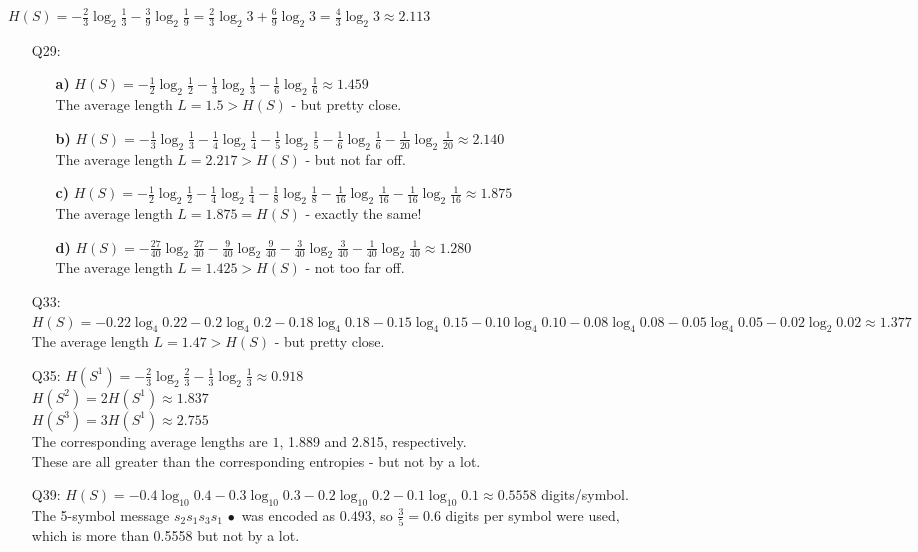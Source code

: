 \documentclass[11pt]{article}
\begin{document}
\newpage{}
$H(S) = -\frac{2}{3}\log_2\frac{1}{3}-\frac{3}{9}\log_2\frac{1}{9}
      =  \frac{2}{3}\log_2 3 + \frac{6}{9}\log_2 3
      =  \frac{4}{3}\log_2 3
      \approx 2.113$

\bigskip{}
\begin{itemize}
  \item[{Q29:}]
    \begin{itemize}
      \item[{\bf a)}] $H(S) = -\frac{1}{2}\log_2\frac{1}{2} -\frac{1}{3}\log_2\frac{1}{3} -\frac{1}{6}\log_2\frac{1}{6} \approx 1.459$
        \\The average length $L = 1.5 > H(S)$ - but pretty close.
      \item[{\bf b)}] $H(S) = -\frac{1}{3}\log_2\frac{1}{3} -\frac{1}{4}\log_2\frac{1}{4} -\frac{1}{5}\log_2\frac{1}{5} -\frac{1}{6}\log_2\frac{1}{6} -\frac{1}{20}\log_2\frac{1}{20} \approx 2.140$
        \\The average length $L = 2.217 > H(S)$ - but not far off.
      \item[{\bf c)}] $H(S) = -\frac{1}{2}\log_2\frac{1}{2} -\frac{1}{4}\log_2\frac{1}{4} -\frac{1}{8}\log_2\frac{1}{8} -\frac{1}{16}\log_2\frac{1}{16} -\frac{1}{16}\log_2\frac{1}{16} \approx 1.875$
        \\The average length $L = 1.875 = H(S)$ - exactly the same!
      \item[{\bf d)}] $H(S) = -\frac{27}{40}\log_2\frac{27}{40} -\frac{9}{40}\log_2\frac{9}{40} -\frac{3}{40}\log_2\frac{3}{40} -\frac{1}{40}\log_2\frac{1}{40} \approx 1.280$
        \\The average length $L = 1.425 > H(S)$ - not too far off.
    \end{itemize}
  \item[{Q33:}] $H(S) = -0.22\log_4 0.22 -0.2\log_4 0.2 - 0.18\log_4 0.18 - 0.15\log_4 0.15 - 0.10\log_4 0.10 - 0.08\log_4 0.08 - 0.05\log_4 0.05 - 0.02\log_2 0.02  \approx 1.377$
        \\The average length $L =  1.47 > H(S)$ - but pretty close.
  \item[{Q35:}] $H(S^1) = -\frac{2}{3}\log_2\frac{2}{3} -\frac{1}{3}\log_2\frac{1}{3} \approx 0.918$
        \\$H(S^2) = 2H(S^1) \approx 1.837$
        \\$H(S^3) = 3H(S^1) \approx 2.755$
        \\The corresponding average lengths are $1$, 1.889 and 2.815, respectively.
        \\These are all greater than the corresponding entropies - but not by a lot.
  \item[{Q39:}] $H(S) = -0.4\log_{10}0.4 -0.3\log_{10}0.3 - 0.2\log_{10}0.2 -0.1\log_{10}0.1 \approx 0.5558$ digits/symbol.
        \\The 5-symbol message $s_2s_1s_3s_1\,\bullet$ was encoded as $0.493$, so $\frac{3}{5} = 0.6$ digits per symbol were used,
        \\which is more than 0.5558 but not by a lot.
\end{itemize}
\end{document}

